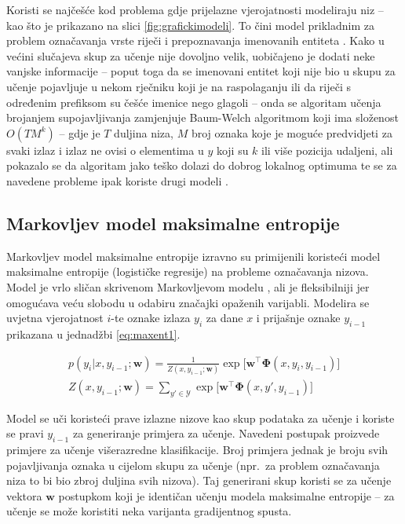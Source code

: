 Koristi se najčešće kod problema gdje prijelazne vjerojatnosti modeliraju niz --
kao što je prikazano na slici \ref{fig:grafickimodeli}. To čini model prikladnim
za problem označavanja vrste riječi \citep{halacsy2007hunpos} i prepoznavanja
imenovanih entiteta \citep{zhou2002named}. Kako u većini slučajeva skup za
učenje nije dovoljno velik, uobičajeno je dodati neke vanjske informacije --
poput toga da se imenovani entitet koji nije bio u skupu za učenje pojavljuje u
nekom rječniku koji je na raspolaganju ili da riječi s određenim prefiksom su
češće imenice nego glagoli -- onda se algoritam učenja brojanjem supojavljivanja
zamjenjuje Baum-Welch algoritmom koji ima složenost $O(T M^k)$ -- gdje je $T$
duljina niza, $M$ broj oznaka koje je moguće predvidjeti za svaki izlaz i izlaz ne
ovisi o elementima u $y$ koji su $k$ ili više pozicija udaljeni, ali pokazalo se
da algoritam jako teško dolazi do dobrog lokalnog optimuma te se za navedene
probleme ipak koriste drugi modeli \citep{johnson2007doesn}.

\subsection{Markovljev model maksimalne entropije}

Markovljev model maksimalne entropije 
izravno su primijenili \citet*{mccallum2000maximum} koristeći model maksimalne
entropije (logističke regresije) na probleme označavanja nizova. Model je vrlo
sličan skrivenom Markovljevom modelu , ali je
fleksibilniji jer omogućava veću slobodu u odabiru značajki opaženih varijabli.
Modelira se uvjetna vjerojatnost $i$-te oznake izlaza $y_i$ za dane $x$ i
prijašnje oznake $y_{i-1}$ prikazana u jednadžbi \ref{eq:maxent1}.

\begin{equation}\label{eq:maxent1}
\begin{aligned}
  p(y_i | x, y_{i-1}; \mathbf{w}) = \frac{1}{Z(x, y_{i-1}; \mathbf{w})} \exp \big[ \mathbf{w}^\top \mathbf{\Phi}(x, y_i, y_{i-1})\big] \\
  Z(x, y_{i-1}; \mathbf{w}) = \sum_{y' \in \mathcal{Y}} \exp \big[ \mathbf{w}^\top \mathbf{\Phi}(x, y', y_{i-1})\big]
\end{aligned}
\end{equation}

\noindent
Model se uči koristeći prave izlazne nizove kao skup podataka za učenje i
koriste se pravi $y_{i-1}$ za generiranje primjera za učenje. Navedeni postupak
proizvede primjere za učenje višerazredne klasifikacije. Broj primjera jednak je
broju svih pojavljivanja oznaka u cijelom skupu za učenje (npr.~za problem
označavanja niza to bi bio zbroj duljina svih nizova). Taj generirani skup
koristi se za učenje vektora $\mathbf{w}$ postupkom koji je identičan učenju
modela maksimalne entropije -- za učenje se može koristiti neka varijanta
gradijentnog spusta.

